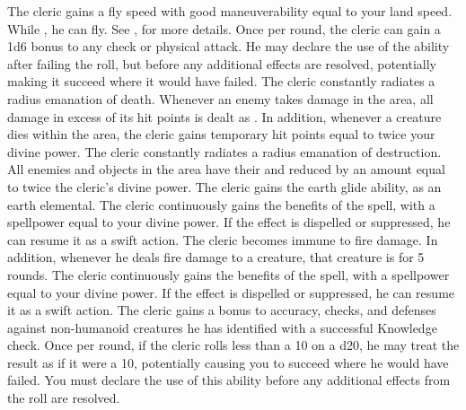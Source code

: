             The cleric gains a fly speed with good maneuverability equal to your land speed.
            While \unencumbered, he can fly.
            See , for more details.
            Once per round, the cleric can gain a \plus1d6 bonus to any check or physical attack.
            He may declare the use of the ability after failing the roll, but before any additional effects are resolved, potentially making it succeed where it would have failed.
            The cleric constantly radiates a \arealarge radius emanation of death.
            Whenever an enemy takes damage in the area, all damage in excess of its hit points is dealt as .
            In addition, whenever a creature dies within the area, the cleric gains temporary hit points equal to twice your divine power.
            The cleric constantly radiates a \arealarge radius emanation of destruction.
            All enemies and objects in the area have their  and  reduced by an amount equal to twice the cleric's divine power.
            The cleric gains the earth glide ability, as an earth elemental.
             The cleric continuously gains the benefits of the 
            spell, with a spellpower equal to your divine power.
            If the effect is dispelled or suppressed, he can resume it as a swift action.
            The cleric becomes immune to fire damage.
            In addition, whenever he deals fire damage to a creature, that creature is \ignited for 5 rounds.
             The cleric continuously gains the benefits of the 
            spell, with a spellpower equal to your divine power.
            If the effect is dispelled or suppressed, he can resume it as a swift action.
            The cleric gains a  bonus to accuracy, checks, and defenses against non-humanoid creatures he has identified with a successful Knowledge check.
            Once per round, if the cleric rolls less than a 10 on a d20, he may treat the result as if it were a 10, potentially causing you to succeed where he would have failed.
            You must declare the use of this ability before any additional effects from the roll are resolved.
